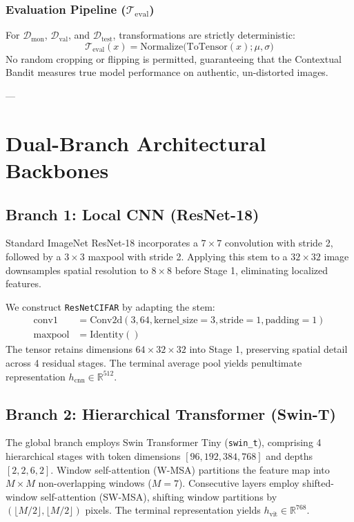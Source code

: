 \documentclass[10pt,journal,compsoc]{IEEEtran}
\begin{document}
\subsubsection{Evaluation Pipeline ($\mathcal{T}_{\text{eval}}$)}
For $\mathcal{D}_{\text{mon}}$, $\mathcal{D}_{\text{val}}$, and $\mathcal{D}_{\text{test}}$, transformations are strictly deterministic:
\begin{equation}
\mathcal{T}_{\text{eval}}(x) = \text{Normalize}\Big(\text{ToTensor}(x); \mu, \sigma\Big)
\end{equation}
No random cropping or flipping is permitted, guaranteeing that the Contextual Bandit measures true model performance on authentic, un-distorted images.

---

\section{Dual-Branch Architectural Backbones}

\subsection{Branch 1: Local CNN (ResNet-18)}
Standard ImageNet ResNet-18 incorporates a $7 \times 7$ convolution with stride 2, followed by a $3 \times 3$ maxpool with stride 2. Applying this stem to a $32 \times 32$ image downsamples spatial resolution to $8 \times 8$ before Stage 1, eliminating localized features. 

We construct \texttt{ResNetCIFAR} by adapting the stem:
\begin{align}
\text{conv1} &= \text{Conv2d}(3, 64, \text{kernel\_size}=3, \text{stride}=1, \text{padding}=1) \\
\text{maxpool} &= \text{Identity}()
\end{align}
The tensor retains dimensions $64 \times 32 \times 32$ into Stage 1, preserving spatial detail across 4 residual stages. The terminal average pool yields penultimate representation $h_{\text{cnn}} \in \mathbb{R}^{512}$.

\subsection{Branch 2: Hierarchical Transformer (Swin-T)}
The global branch employs Swin Transformer Tiny (\texttt{swin\_t}), comprising 4 hierarchical stages with token dimensions $[96, 192, 384, 768]$ and depths $[2, 2, 6, 2]$. Window self-attention (W-MSA) partitions the feature map into $M \times M$ non-overlapping windows ($M=7$). Consecutive layers employ shifted-window self-attention (SW-MSA), shifting window partitions by $(\lfloor M/2 \rfloor, \lfloor M/2 \rfloor)$ pixels. The terminal representation yields $h_{\text{vit}} \in \mathbb{R}^{768}$.
\end{document}
